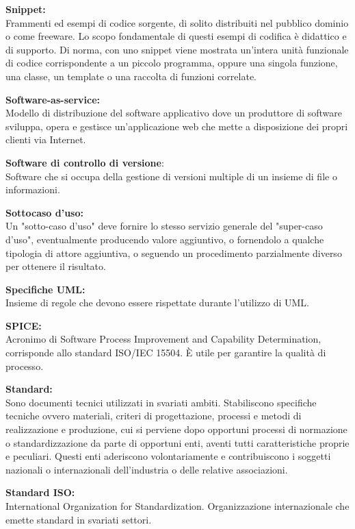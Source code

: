 \documentclass[a4paper, oneside, openany, dvipsnames, table]{article}
\begin{document}
\textbf{Snippet:}\\	Frammenti ed esempi di codice sorgente, di solito distribuiti nel 
pubblico dominio o come freeware. Lo scopo fondamentale di questi esempi di codifica è 
didattico e di supporto. Di norma, con uno snippet viene mostrata un'intera unità funzionale 
di codice corrispondente a un piccolo programma, oppure una singola funzione, una classe, 
un template o una raccolta di funzioni correlate.

\textbf{Software-as-service:}\\	Modello di distribuzione del software applicativo dove un produttore di software sviluppa, opera e gestisce un'applicazione web che mette a disposizione dei propri clienti via Internet.

\textbf{Software di controllo di versione}:\\ Software che si occupa della  gestione di versioni multiple di un insieme di file o informazioni.

\textbf{Sottocaso d'uso:}\\
Un "sotto-caso d'uso" deve fornire lo stesso servizio generale del "super-caso d'uso", eventualmente producendo valore aggiuntivo, o fornendolo a qualche tipologia di attore aggiuntiva, o seguendo un procedimento parzialmente diverso per ottenere il risultato.

\textbf{Specifiche UML:}\\	
Insieme di regole che devono essere rispettate durante l'utilizzo di UML.

\textbf{SPICE:}\\
Acronimo di Software Process Improvement and Capability Determination, corrisponde allo standard ISO/IEC 15504. \`E utile per garantire la qualità di processo.

\textbf{Standard:}\\	Sono documenti tecnici utilizzati in svariati ambiti. Stabiliscono specifiche tecniche ovvero materiali, criteri di progettazione, processi e metodi di realizzazione e produzione, cui si perviene dopo opportuni processi di normazione o standardizzazione da parte di opportuni enti, aventi tutti caratteristiche proprie e peculiari. Questi enti aderiscono volontariamente e contribuiscono i soggetti nazionali o internazionali dell'industria o delle relative associazioni.

\textbf{Standard ISO:}\\	International Organization for Standardization. Organizzazione internazionale che emette standard in svariati settori.
\end{document}
